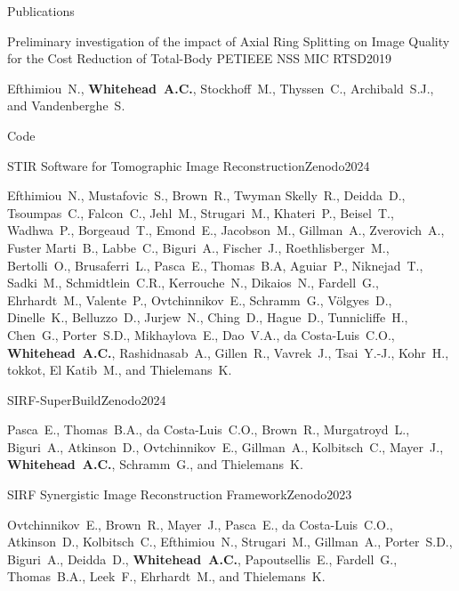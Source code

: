 \documentclass{cv}
\begin{document}
\begin{spacing}{1.0}
\begin{rSection}{Publications}
            \item \begin{rSubsection}{Preliminary investigation of the impact of Axial Ring Splitting on Image Quality for the Cost Reduction of Total-Body PET}{}{IEEE NSS MIC RTSD}{2019}
                \item Efthimiou~N., \textbf{Whitehead~A.C.}, Stockhoff~M., Thyssen~C., Archibald~S.J., and Vandenberghe~S.
            \end{rSubsection}
        \end{rSection}
        
        \begin{rSection}{Code}
            \item \begin{rSubsection}{STIR Software for Tomographic Image Reconstruction}{}{Zenodo}{2024}
                \item Efthimiou~N., Mustafovic~S., Brown~R., Twyman Skelly~R., Deidda~D., Tsoumpas~C., Falcon~C., Jehl~M., Strugari~M., Khateri~P., Beisel~T., Wadhwa~P., Borgeaud~T., Emond~E., Jacobson~M., Gillman~A., Zverovich~A., Fuster Marti~B., Labbe~C., Biguri~A., Fischer~J., Roethlisberger~M., Bertolli~O., Brusaferri~L., Pasca~E., Thomas~B.A, Aguiar~P., Niknejad~T., Sadki~M., Schmidtlein~C.R., Kerrouche~N., Dikaios~N., Fardell~G., Ehrhardt~M., Valente~P., Ovtchinnikov~E., Schramm~G., Völgyes~D., Dinelle~K., Belluzzo~D., Jurjew~N., Ching~D., Hague~D., Tunnicliffe~H., Chen~G., Porter~S.D., Mikhaylova~E., Dao~V.A., da Costa-Luis~C.O., \textbf{Whitehead~A.C.}, Rashidnasab~A., Gillen~R., Vavrek~J., Tsai~Y.-J., Kohr~H., tokkot, El Katib~M., and Thielemans~K.
            \end{rSubsection}

            \item \begin{rSubsection}{SIRF-SuperBuild}{}{Zenodo}{2024}
                \item Pasca~E., Thomas~B.A., da Costa-Luis~C.O., Brown~R., Murgatroyd~L., Biguri~A., Atkinson~D., Ovtchinnikov~E., Gillman~A., Kolbitsch~C., Mayer~J., \textbf{Whitehead~A.C.}, Schramm~G., and Thielemans~K.
            \end{rSubsection}
            
            \item \begin{rSubsection}{SIRF Synergistic Image Reconstruction Framework}{}{Zenodo}{2023}
                \item Ovtchinnikov~E., Brown~R., Mayer~J., Pasca~E., da Costa-Luis~C.O., Atkinson~D., Kolbitsch~C., Efthimiou~N., Strugari~M., Gillman~A., Porter~S.D., Biguri~A., Deidda~D., \textbf{Whitehead~A.C.}, Papoutsellis~E., Fardell~G., Thomas~B.A., Leek~F., Ehrhardt~M., and Thielemans~K.
            \end{rSubsection}
            

\end{rSection}
\end{spacing}
\end{document}
